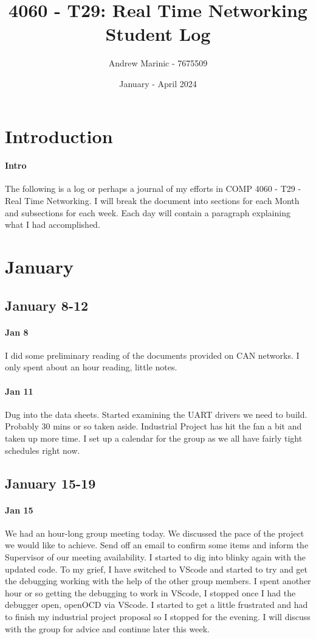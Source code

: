 \documentclass{article}
\title{4060 - T29: Real Time Networking \\ Student Log}
\author{Andrew Marinic - 7675509}
\date{January - April 2024}
\begin{document}
\maketitle
\newpage

\tableofcontents

\newpage

\section{Introduction}
\paragraph{Intro}
The following is a log or perhaps a journal of my efforts in COMP 4060 - T29 - Real Time Networking. I will break the document into sections for each Month and subsections for each week. Each day will contain a paragraph explaining what I had accomplished. 
\section{January}
\subsection{January 8-12}
\paragraph{Jan 8}
I did some preliminary reading of the documents provided on CAN networks. I only spent about an hour reading, little notes. 
\paragraph{Jan 11}
Dug into the data sheets. Started examining the UART drivers we need to build. Probably 30 mins or so taken aside. Industrial Project has hit the fan a bit and taken up more time. I set up a calendar for the group as we all have fairly tight schedules right now.
\subsection{January 15-19}
\paragraph{Jan 15}
We had an hour-long group meeting today. We discussed the pace of the project we would like to achieve. Send off an email to confirm some items and inform the Supervisor of our meeting availability. I started to dig into blinky again with the updated code. To my grief, I have switched to VScode and started to try and get the debugging working with the help of the other group members. I spent another hour or so getting the debugging to work in VScode, I stopped once I had the debugger open, openOCD via VScode. I started to get a little frustrated and had to finish my industrial project proposal so I stopped for the evening. I will discuss with the group for advice and continue later this week. 
\end{document}
